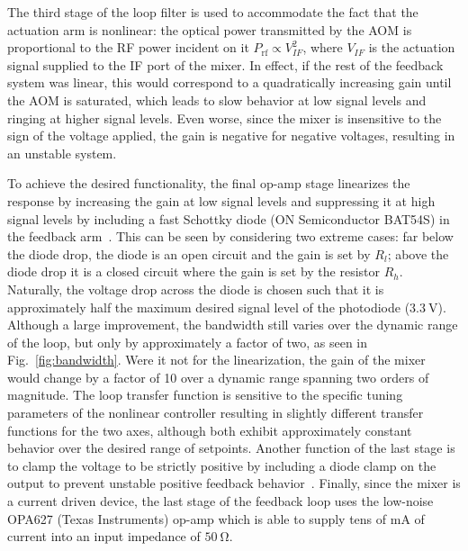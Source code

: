 \documentclass[twocolumn,aip,rsi,reprint,bibnotes]{revtex4-1}
\newcommand\unit[2]{\ensuremath{#1~\mathrm{{#2}}}}
\begin{document}
The third stage of the loop filter is used to accommodate the fact that the actuation arm is nonlinear: the optical power transmitted by the AOM is proportional to the RF power incident on it $P_{\mathrm{rf}}\propto V_{IF}^2$, where $V_{IF}$ is the actuation signal supplied to the IF port of the mixer.
In effect, if the rest of the feedback system was linear, this would correspond to a quadratically increasing gain until the AOM is saturated, which leads to slow behavior at low signal levels and ringing at higher signal levels.
Even worse, since the mixer is insensitive to the sign of the voltage applied, the gain is negative for negative voltages, resulting in an unstable system.

To achieve the desired functionality, the final op-amp stage linearizes the response by increasing the gain at low signal levels and suppressing it at high signal levels by including a fast Schottky diode (ON Semiconductor BAT54S) in the feedback arm~\cite{Horowitz2015}.
This can be seen by considering two extreme cases: far below the diode drop, the diode is an open circuit and the gain is set by $R_l$; above the diode drop it is a closed circuit where the gain is set by the resistor $R_h$.
Naturally, the voltage drop across the diode is chosen such that it is approximately half the maximum desired signal level of the photodiode (\unit{3.3}{V}).
Although a large improvement, the bandwidth still varies over the dynamic range of the loop, but only by approximately a factor of two, as seen in Fig.~\ref{fig:bandwidth}.
Were it not for the linearization, the gain of the mixer would change by a factor of 10 over a dynamic range spanning two orders of magnitude.
The loop transfer function is sensitive to the specific tuning parameters of the nonlinear controller resulting in slightly different transfer functions for the two axes, although both exhibit approximately constant behavior over the desired range of setpoints.
Another function of the last stage is to clamp the voltage to be strictly positive by including a diode clamp on the output to prevent unstable positive feedback behavior~\cite{Horowitz2015}.
Finally, since the mixer is a current driven device, the last stage of the feedback loop uses the low-noise OPA627 (Texas Instruments) op-amp which is able to supply tens of mA of current into an input impedance of \unit{50}{\Omega}.
\end{document}
